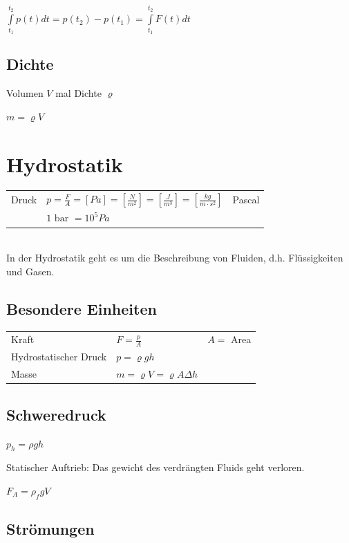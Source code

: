 \documentclass[a4paper]{scrartcl}
\begin{document}
	$\int\limits^{t_2}_{t_1} p(t) dt = p(t_2) - p(t_1) = \int\limits^{t_2}_{t_1} F(t) dt$


\subsection{Dichte}

	Volumen $V$ mal Dichte $\varrho$
	 
	$m = \varrho V$

\section{Hydrostatik}
	\begin{tabu} {l X l}
		\hline
		Druck
		&	$p = \frac{F}{A} = \left[ Pa \right] = \left[ \frac{N}{m^2} \right] = \left[ \frac{J}{m^3} \right] = \left[ \frac{kg}{m \cdot s^2} \right]$
		&	Pascal \\
		& $1 \text{ bar } = 10^5 Pa$
		\\ \hline
	\end{tabu}

	\hfill \\
	In der Hydrostatik geht es um die Beschreibung von Fluiden, d.h. Flüssigkeiten und Gasen.

\subsection{Besondere Einheiten} %
	\begin{tabu} {l X r}
		Kraft & $F = \frac{p}{A}$ & $A =$ Area\\
		Hydrostatischer Druck & $p = \varrho g h$ & \\
		Masse & $m = \varrho V = \varrho A \Delta h$
	\end{tabu}



\subsection{Schweredruck}


$p_h = \rho g h$


Statischer Auftrieb: Das gewicht des verdrängten Fluids geht verloren.

$F_A = \rho_f g V$

\subsection{Strömungen}
\end{document}
